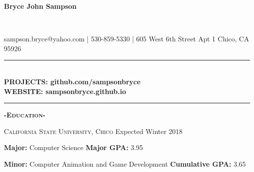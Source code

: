 \documentclass[12pt]{article}
\begin{document}
\center
\begin{Huge}\textbf{Bryce John Sampson}\end{Huge}\\
\medskip
\fontsize{12}{1.2}
\selectfont

\noindent
sampson.bryce@yahoo.com | 530-859-5330 | 605 West 6th Street Apt 1 Chico, CA 95926
\noindent\rule{17cm}{0.4pt}\\
\smallskip
\textbf{PROJECTS: \color{TealBlue}github.com/sampsonbryce}\\
\smallskip
\textbf{WEBSITE: \color{TealBlue}sampsonbryce.github.io}\\
\smallskip
\noindent\rule{17cm}{0.4pt}

\center
\textbf{\textsc{-Education-}}\\
\flushleft
\begin{footnotesize}
\textsc{California State University, Chico}
\hfill
\color{gray}Expected Winter 2018\\
\color{black}
\smallskip

\color{Cerulean}\textbf{Major: }\color{black}Computer Science
\hfill
\color{Cerulean}\textbf{Major GPA: }\color{black}3.95\\
\smallskip

\color{Cerulean}\textbf{Minor: }\color{black}Computer Animation and Game Development
\hfill
\color{Cerulean}\textbf{Cumulative GPA: }\color{black}3.65\\
\smallskip

\end{footnotesize}

\smallskip
\end{document}
